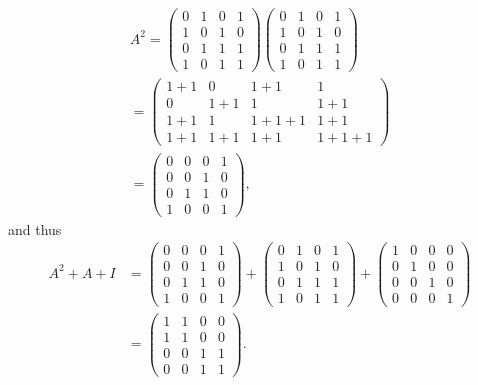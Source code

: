 \documentclass[11pt]{scrartcl}
\begin{document}
\begin{soln}
  \begin{align}
    A^2 = 
  \begin{pmatrix}
    0 & 1 & 0 & 1\\
    1 & 0 & 1 & 0\\
    0 & 1 & 1 & 1\\
    1 & 0 & 1 & 1
  \end{pmatrix}
  \begin{pmatrix}
    0 & 1 & 0 & 1\\
    1 & 0 & 1 & 0\\
    0 & 1 & 1 & 1\\
    1 & 0 & 1 & 1
  \end{pmatrix}\\
=
\begin{pmatrix}
1 + 1 & 0 & 1+1 & 1\\
0 & 1+1 & 1 & 1 + 1\\
1 + 1 & 1 & 1+1+1 & 1+1\\
1 +1 & 1 +1 & 1 +1 & 1 + 1 +1
\end{pmatrix}\\
=
\begin{pmatrix}
0 & 0 & 0 & 1\\
0 & 0 & 1 & 0\\
0 & 1 & 1 & 0\\
1 & 0 & 0 & 1
\end{pmatrix},
  \end{align}
and thus 
\begin{align}
A^2 + A + I &= 
\begin{pmatrix}
0 & 0 & 0 & 1\\
0 & 0 & 1 & 0\\
0 & 1 & 1 & 0\\
1 & 0 & 0 & 1
\end{pmatrix}
+
  \begin{pmatrix}
    0 & 1 & 0 & 1\\
    1 & 0 & 1 & 0\\
    0 & 1 & 1 & 1\\
    1 & 0 & 1 & 1
  \end{pmatrix}
+
                \begin{pmatrix}
                  1 & 0 & 0 & 0\\
                  0 & 1 & 0 & 0\\
                  0 & 0 & 1 & 0\\
                  0 & 0 & 0 & 1
                \end{pmatrix}\\
            &=
 \begin{pmatrix}
   1 & 1 & 0 & 0\\
   1 & 1 & 0 & 0\\
   0 & 0 & 1 & 1\\
   0 & 0 & 1 & 1
 \end{pmatrix}.
\end{align}


\end{soln}
\end{document}
